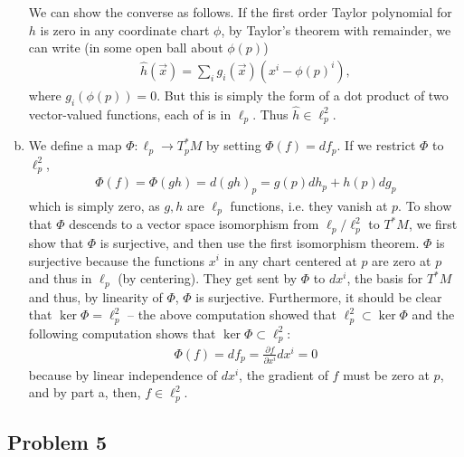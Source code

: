 \documentclass{../../mathnotes}
\begin{document}
\begin{enumerate}[(a)]
        We can show the converse as follows. If the first order Taylor polynomial for $h$ is zero in any coordinate chart $\phi$, by Taylor's theorem
        with remainder, we can write (in some open ball about $\phi(p)$)
        \begin{align*}
            \hat h(\vec x)=\sum_i g_i(\vec x)(x^i-\phi(p)^i),
        \end{align*}
        where $g_i(\phi(p))=0$. But this is simply the form of a dot product of two vector-valued functions, each of is in $\ell_p$.
        Thus $\hat h\in\ell_p^2$.
    \item We define a map $\Phi:\ell_p\to T_p^*M$ by setting $\Phi(f)=df_p$. If we restrict $\Phi$ to $\ell_p^2$,
        \begin{align*}
            \Phi(f)=\Phi(gh)=d(gh)_p=g(p)dh_p+h(p)dg_p
        \end{align*}
        which is simply zero, as $g,h$ are $\ell_p$ functions, i.e. they vanish at $p$. To show that $\Phi$ descends to a vector
        space isomorphism from $\ell_p/\ell_p^2$ to $T^*M$, we first show that $\Phi$ is surjective, and then use the first isomorphism theorem.
        $\Phi$ is surjective because the functions $x^i$ in any chart centered at $p$ are zero at $p$ and thus in $\ell_p$ (by centering).
        They get sent by $\Phi$ to $dx^i$, the basis for $T^*M$ and thus, by linearity of $\Phi$, $\Phi$ is surjective.
        Furthermore, it should be clear that $\ker\Phi=\ell_p^2$ -- the above computation showed that $\ell_p^2\subset\ker\Phi$ and the following
        computation shows that $\ker\Phi\subset\ell_p^2$:
        \begin{align*}
            \Phi(f)=df_p=\frac{\partial f}{\partial x^i}dx^i=0
        \end{align*}
        because by linear independence of $dx^i$, the gradient of $f$ must be zero at $p$, and by part a, then, $f\in\ell^2_p$.
\end{enumerate}

\subsection*{Problem 5}
\end{document}
